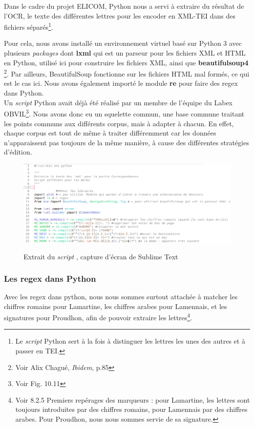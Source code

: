 Dans le cadre du projet ELICOM, Python nous a servi à extraire du résultat de l'OCR, le texte des différentes lettres pour les encoder en XML-TEI dans des fichiers séparés\footnote{Le \emph{script} Python sert à la fois à distinguer les lettres les unes des autres et à passer en TEI.}.

Pour cela, nous avons installé un environnement virtuel basé sur Python 3 avec plusieurs \emph{packages} dont \textbf{lxml} qui est un parseur pour les fichiers XML et HTML en Python, utilisé ici pour construire les fichiers XML,  ainsi que \textbf{beautifulsoup4} \footnote{Voir Alix Chagué, \emph{Ibidem}, p.85}. Par ailleurs, BeautifulSoup fonctionne sur les fichiers HTML mal formés, ce qui est le cas ici. Nous avons également importé le module \textbf{re} pour faire des regex dans Python.\\

Un \emph{script} Python avait déjà été réalisé par un membre de l'équipe du Labex OBVIL\footnote{Voir Fig. 10.11}. Nous avons donc eu un squelette commun, une base commune traitant les points communs aux différents corpus, mais à adapter à chacun. En effet, chaque corpus est tout de même à traiter différemment car les données n'apparaissent pas toujours de la même manière, à cause des différentes stratégies d'édition.

\begin{figure}[ht]
    \centering
    \caption{Extrait du \emph{script} , capture d'écran de Sublime Text}
    \includegraphics[width=15cm]{images/extraction.png}
    \label{extraction}
\end{figure}

\subsubsection{Les regex dans Python}

Avec les regex dans python, nous nous sommes surtout attachée à matcher les chiffres romains pour Lamartine, les chiffres arabes pour Lamennais, et les signatures pour Proudhon, afin de pouvoir extraire les lettres\footnote{Voir 8.2.5 Premiers repérages des marqueurs : pour Lamartine, les lettres sont toujours introduites par des chiffres romains, pour Lamennais par des chiffres arabes. Pour Proudhon, nous nous sommes servie de sa signature.}.

